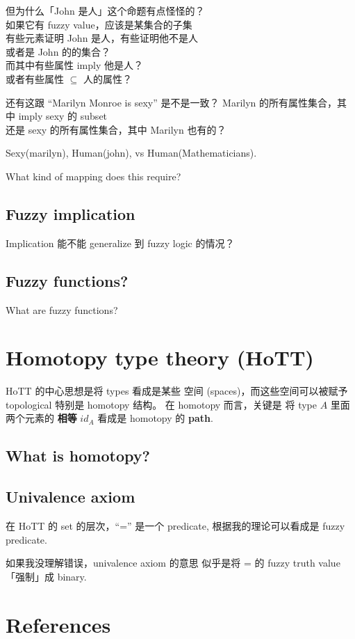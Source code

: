 但为什么「John 是人」这个命题有点怪怪的？ \\
如果它有 fuzzy value，应该是某集合的子集 \\
有些元素证明 John 是人，有些证明他不是人 \\
或者是 John 的的集合？ \\
而其中有些属性 imply 他是人？ \\
或者有些属性 $\subseteq$ 人的属性？

还有这跟 ``Marilyn Monroe is sexy'' 是不是一致？
Marilyn 的所有属性集合，其中 imply sexy 的 subset \\
还是 sexy 的所有属性集合，其中 Marilyn 也有的？

Sexy(marilyn), Human(john), vs Human(Mathematicians).


What kind of mapping does this require?

\subsection{Fuzzy implication}
\label{sec:fuzzy-implication}

Implication 能不能 generalize 到 fuzzy logic 的情况？

\subsection{Fuzzy functions?}

What are fuzzy functions?

\section{Homotopy type theory (HoTT)}

HoTT 的中心思想是将 types 看成是某些 空间 (spaces)，而这些空间可以被赋予 topological 特别是 homotopy 结构。 在 homotopy 而言，关键是 将 type $A$ 里面两个元素的 \textbf{相等} $id_A$ 看成是 homotopy 的 \textbf{path}.

\subsection{What is homotopy?}

\subsection{Univalence axiom}

在 HoTT 的 set 的层次，``='' 是一个 predicate, 根据我的理论可以看成是 fuzzy predicate.

如果我没理解错误，univalence axiom 的意思 似乎是将 = 的 fuzzy truth value「强制」成 binary.

\section*{References}
 \smiley \\ \vspace*{0.4cm}
\printbibliography

 
